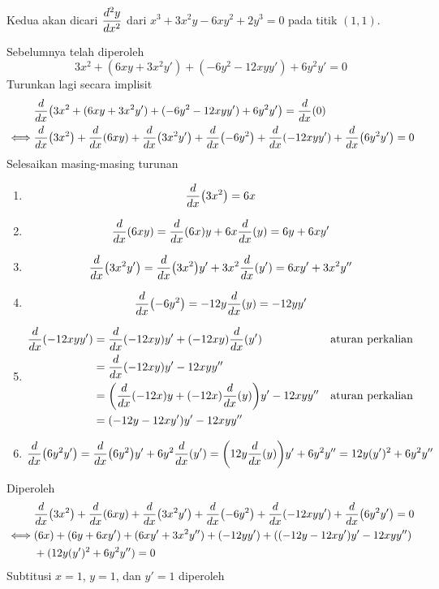 \begin{enumerate}[leftmargin=*, label={\arabic*}.]
\begin{enumerate}[label={\alph*}.]
    Kedua akan dicari $\displaystyle\frac{d^{2}y}{dx^{2}}$ dari 
    $x^{3}+3x^{2}y-6xy^{2}+2y^{3}=0$ pada titik $(1,1)$.

    Sebelumnya telah diperoleh
    \[
        3x^{2}+(6xy+3x^{2}y')+(-6y^2-12xyy')+6y^{2}y'=0
    \]
    Turunkan lagi secara implisit
    \begin{align*}
        &\drv{x}{3x^{2}+(6xy+3x^{2}y')+(-6y^2-12xyy')+6y^{2}y'} = \drv{x}{0}\\
        \iff &\drv{x}{3x^{2}}+\drv{x}{6xy}+\drv{x}{3x^{2}y'}
        +\drv{x}{-6y^{2}}+\drv{x}{-12xyy'}+\drv{x}{6y^{2}y'}=0
    \end{align*}
    Selesaikan masing-masing turunan
    \begin{enumerate}[label={\arabic*})]
    \item \[
        \drv{x}{3x^{2}} = 6x
    \]
    \item \[
        \drv{x}{6xy} = \drv{x}{6x}y + 6x\drv{x}{y} = 6y+6xy'
    \]
    \item \[
        \drv{x}{3x^{2}y'} = \drv{x}{3x^{2}}y' + 3x^{2}\drv{x}{y'} = 6xy'+3x^{2}y''
    \]
    \item \[
        \drv{x}{-6y^{2}} = -12y\drv{x}{y} = -12yy'
    \]
    \item \begin{align*}
        \drv{x}{-12xyy'} &= \drv{x}{-12xy}y'+(-12xy)\drv{x}{y'}
        &\text{aturan perkalian}\\
        &=\drv{x}{-12xy}y'-12xyy''\\
        &=\bracket*{\drv{x}{-12x}y+(-12x)\drv{x}{y}}y'-12xyy''
        &\text{aturan perkalian}\\
        &=(-12y-12xy')y'-12xyy''
    \end{align*}
    \item \[
        \drv{x}{6y^{2}y'} = \drv{x}{6y^{2}}y' + 6y^{2}\drv{x}{y'} 
        =\bracket*{12y\drv{x}{y}}y'+6y^{2}y''=12y(y')^{2}+6y^{2}y''
    \]
    \end{enumerate}
    Diperoleh
    \begin{align*}
        &\drv{x}{3x^{2}}+\drv{x}{6xy}+\drv{x}{3x^{2}y'}
        +\drv{x}{-6y^{2}}+\drv{x}{-12xyy'}+\drv{x}{6y^{2}y'}=0\\
        \iff &(6x)+(6y+6xy')+(6xy'+3x^{2}y'')+(-12yy')
        +\bracket*{(-12y-12xy')y'-12xyy''}\\
        &+(12y(y')^{2}+6y^{2}y'')=0
    \end{align*}
    Subtitusi $x=1$, $y=1$, dan $y'=1$ diperoleh
    \begin{align*}

\end{align*}
\end{enumerate}
\end{enumerate}
